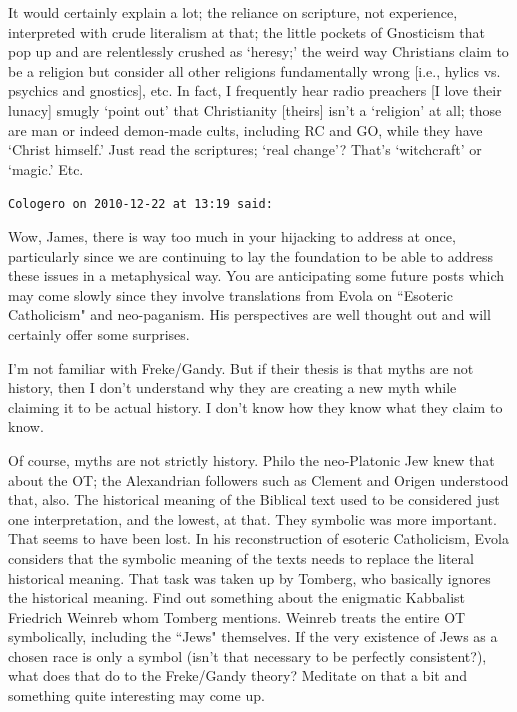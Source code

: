 \begin{footnotesize}
\begin{sffamily}
It would certainly explain a lot; the reliance on scripture, not experience, interpreted with crude literalism at that; the little pockets of Gnosticism that pop up and are relentlessly crushed as `heresy;' the weird way Christians claim to be a religion but consider all other religions fundamentally wrong [i.e., hylics vs. psychics and gnostics], etc. In fact, I frequently hear radio preachers [I love their lunacy] smugly `point out' that Christianity [theirs] isn't a `religion' at all; those are man or indeed demon-made cults, including RC and GO, while they have `Christ himself.' Just read the scriptures; `real change'? That's `witchcraft' or `magic.' Etc.


\hfill

\texttt{Cologero on 2010-12-22 at 13:19 said: }

Wow, James, there is way too much in your hijacking to address at once, particularly since we are continuing to lay the foundation to be able to address these issues in a metaphysical way. You are anticipating some future posts which may come slowly since they involve translations from Evola on ``Esoteric Catholicism" and neo-paganism. His perspectives are well thought out and will certainly offer some surprises.

I'm not familiar with Freke/Gandy. But if their thesis is that myths are not history, then I don't understand why they are creating a new myth while claiming it to be actual history. I don't know how they know what they claim to know.

Of course, myths are not strictly history. Philo the neo-Platonic Jew knew that about the OT; the Alexandrian followers such as Clement and Origen understood that, also. The historical meaning of the Biblical text used to be considered just one interpretation, and the lowest, at that. They symbolic was more important. That seems to have been lost. In his reconstruction of esoteric Catholicism, Evola considers that the symbolic meaning of the texts needs to replace the literal historical meaning. That task was taken up by Tomberg, who basically ignores the historical meaning. Find out something about the enigmatic Kabbalist Friedrich Weinreb whom Tomberg mentions. Weinreb treats the entire OT symbolically, including the ``Jews" themselves. If the very existence of Jews as a chosen race is only a symbol (isn't that necessary to be perfectly consistent?), what does that do to the Freke/Gandy theory? Meditate on that a bit and something quite interesting may come up.


\end{sffamily}
\end{footnotesize}
